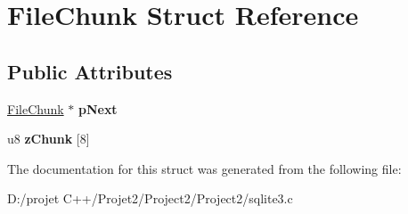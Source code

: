 \hypertarget{struct_file_chunk}{}\section{File\+Chunk Struct Reference}
\label{struct_file_chunk}
\subsection*{Public Attributes}
\begin{DoxyCompactItemize}
\item 
\mbox{\label{struct_file_chunk_ad2d0d170afc7ce1e239e8716852e247b}} 
\mbox{\hyperlink{struct_file_chunk}{File\+Chunk}} $\ast$ {\bfseries p\+Next}
\item 
\mbox{\label{struct_file_chunk_a1e7a92812b21bba27661fb38a5f597a7}} 
u8 {\bfseries z\+Chunk} \mbox{[}8\mbox{]}
\end{DoxyCompactItemize}


The documentation for this struct was generated from the following file\+:\begin{DoxyCompactItemize}
\item 
D\+:/projet C++/\+Projet2/\+Project2/\+Project2/sqlite3.\+c\end{DoxyCompactItemize}
